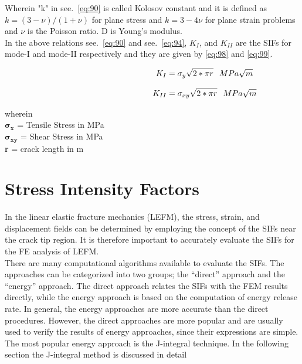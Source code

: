 \documentclass[fleqn, 12.5pt,a4paper]{report}
\newcommand\tab[1][1cm]{\hspace*{#1}}
\begin{document}
Wherein "k" in see.~\autoref{eq:90} is called Kolosov constant and it is defined as $k=(3-\nu)/(1+\nu)$ for plane stress and $k=3-4\nu$ for plane strain problems and $\nu$ is the Poisson ratio. D is Young's modulus.
\\
In the above relations see.~\autoref{eq:90} and see.~\autoref{eq:94}, $K_{I}$, and $K_{II}$ are the SIFs for mode-I and mode-II respectively and they are given by \autoref{eq:98} and \autoref{eq:99}.

\begin{align}\label{eq:98}\hspace{4.5cm}
K_I = \sigma_y \sqrt{2*\pi r} \tab[0.25cm] MPa\sqrt{m}
\end{align}

\begin{align}\label{eq:99}\hspace{4.5cm}
K_{II} = \sigma_{xy} \sqrt{2*\pi r} \tab[0.25cm] MPa\sqrt{m}    
\end{align}

wherein
\\
\tab[1cm] $\mathbold{\sigma_{x}}$ = Tensile Stress in MPa
\\
\tab[1cm] $\mathbold{\sigma_{xy}}$ = Shear Stress in MPa
\\
\tab[1cm] \textbf{r} = crack length in m

\section{\large{Stress Intensity Factors}}

In the linear elastic fracture mechanics (LEFM), the stress, strain, and displacement fields can be determined by employing the concept of the SIFs near the crack tip region. It is therefore important to accurately evaluate the SIFs for the FE analysis of LEFM.\\

There are many computational algorithms available to evaluate the SIFs. The approaches can be categorized into two groups; the “direct” approach and the “energy” approach. The direct approach relates the SIFs with the FEM results directly, while the energy approach is based on the computation of energy release rate. In general, the energy approaches are more accurate than the direct procedures. However, the direct approaches are more popular and are usually used to verify the results of energy approaches, since their expressions are simple. The most popular energy approach is the J-integral technique\cite{khoei2014extended}. In the following section the J-integral method is discussed in detail
\end{document}
